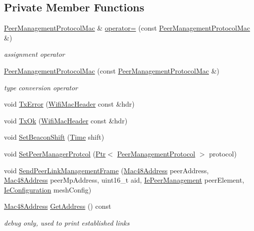 \subsection*{Private Member Functions}
\begin{DoxyCompactItemize}
\item 
\hyperlink{classns3_1_1dot11s_1_1PeerManagementProtocolMac}{Peer\+Management\+Protocol\+Mac} \& \hyperlink{classns3_1_1dot11s_1_1PeerManagementProtocolMac_a1817dc5f93dbee52366e30a4591884c9}{operator=} (const \hyperlink{classns3_1_1dot11s_1_1PeerManagementProtocolMac}{Peer\+Management\+Protocol\+Mac} \&)
\begin{DoxyCompactList}\small\item\em assignment operator \end{DoxyCompactList}\item 
\hyperlink{classns3_1_1dot11s_1_1PeerManagementProtocolMac_a2553be8393140712568d053016ff5687}{Peer\+Management\+Protocol\+Mac} (const \hyperlink{classns3_1_1dot11s_1_1PeerManagementProtocolMac}{Peer\+Management\+Protocol\+Mac} \&)
\begin{DoxyCompactList}\small\item\em type conversion operator \end{DoxyCompactList}\item 
void \hyperlink{classns3_1_1dot11s_1_1PeerManagementProtocolMac_a8c4bce3c9391b9b462fade70ee4ae648}{Tx\+Error} (\hyperlink{classns3_1_1WifiMacHeader}{Wifi\+Mac\+Header} const \&hdr)
\item 
void \hyperlink{classns3_1_1dot11s_1_1PeerManagementProtocolMac_a33eafda3353963be4f54a2b58eea768a}{Tx\+Ok} (\hyperlink{classns3_1_1WifiMacHeader}{Wifi\+Mac\+Header} const \&hdr)
\item 
void \hyperlink{classns3_1_1dot11s_1_1PeerManagementProtocolMac_afcfc9bef3d8ea6b6cfc25816aa5fe582}{Set\+Beacon\+Shift} (\hyperlink{classns3_1_1Time}{Time} shift)
\item 
void \hyperlink{classns3_1_1dot11s_1_1PeerManagementProtocolMac_a734f2c51efc32382a8b171e9348d171a}{Set\+Peer\+Manager\+Protcol} (\hyperlink{classns3_1_1Ptr}{Ptr}$<$ \hyperlink{classns3_1_1dot11s_1_1PeerManagementProtocol}{Peer\+Management\+Protocol} $>$ protocol)
\item 
void \hyperlink{classns3_1_1dot11s_1_1PeerManagementProtocolMac_ac115ede0884b0aab008867d5f4354e38}{Send\+Peer\+Link\+Management\+Frame} (\hyperlink{classns3_1_1Mac48Address}{Mac48\+Address} peer\+Address, \hyperlink{classns3_1_1Mac48Address}{Mac48\+Address} peer\+Mp\+Address, uint16\+\_\+t aid, \hyperlink{classns3_1_1dot11s_1_1IePeerManagement}{Ie\+Peer\+Management} peer\+Element, \hyperlink{classns3_1_1dot11s_1_1IeConfiguration}{Ie\+Configuration} mesh\+Config)
\item 
\hyperlink{classns3_1_1Mac48Address}{Mac48\+Address} \hyperlink{classns3_1_1dot11s_1_1PeerManagementProtocolMac_a2396098d72f79ddb9283675c03d33c7c}{Get\+Address} () const 
\begin{DoxyCompactList}\small\item\em debug only, used to print established links \end{DoxyCompactList}\end{DoxyCompactItemize}
